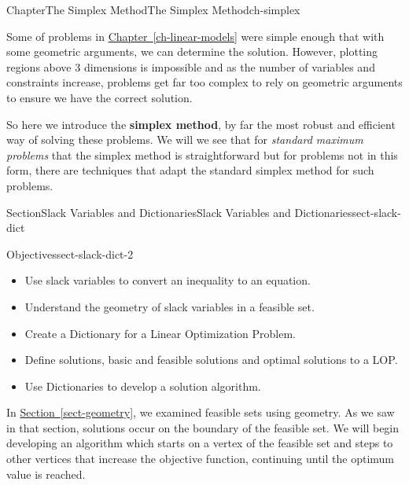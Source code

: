 \documentclass[oneside,10pt,]{book}
\newcommand{\xreffont}{\relax}
\newcommand{\terminology}[1]{\textbf{#1}}
\numberwithin{equation}{section}
\begin{document}
\begin{chapterptx}{Chapter}{The Simplex Method}{}{The Simplex Method}{}{}{ch-simplex}
\renewcommand*{\chaptername}{Chapter}
\begin{introduction}{}%
Some of problems in \hyperref[ch-linear-models]{Chapter~{\xreffont\ref{ch-linear-models}}} were simple enough that with some geometric arguments, we can determine the solution.  However, plotting regions above 3 dimensions is impossible and as the number of variables and constraints increase, problems get far too complex to rely on geometric arguments to ensure we have the correct solution.%
\par
So here we introduce the \terminology{simplex method}, by far the most robust and efficient way of solving these problems.  We will we see that for \emph{standard maximum problems} that the simplex method is straightforward but for problems not in this form, there are techniques that adapt the standard simplex method for such problems.%
\end{introduction}%
%
%
\typeout{************************************************}
\typeout{************************************************}
%
\begin{sectionptx}{Section}{Slack Variables and Dictionaries}{}{Slack Variables and Dictionaries}{}{}{sect-slack-dict}
\begin{objectives}{Objectives}{sect-slack-dict-2}
%
\begin{itemize}[label=\textbullet]
\item{}Use slack variables to convert an inequality to an equation.%
\item{}Understand the geometry of slack variables in a feasible set.%
\item{}Create a Dictionary for a Linear Optimization Problem.%
\item{}Define solutions, basic and feasible solutions and optimal solutions to a LOP.%
\item{}Use Dictionaries to develop a solution algorithm.%
\end{itemize}
\end{objectives}
\begin{introduction}{}%
In \hyperref[sect-geometry]{Section~{\xreffont\ref{sect-geometry}}}, we examined feasible sets using geometry. As we saw in that section, solutions occur on the boundary of the feasible set. We will begin developing an algorithm which starts on a vertex of the feasible set and steps to other vertices that increase the objective function, continuing until the optimum value is reached.%

\end{introduction}
\end{sectionptx}
\end{chapterptx}
\end{document}
